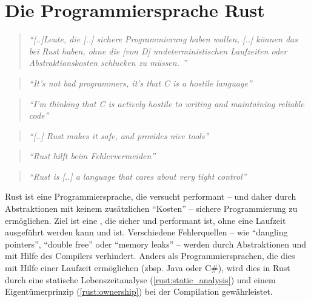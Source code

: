 
\chapter{Die Programmiersprache Rust}

\begin{quotation}
	\textit{\enquote{[..]Leute, die [..] sichere Programmierung haben wollen, [..] können das bei Rust haben, ohne die [von D] undeterministischen Laufzeiten oder Abstraktionskosten schlucken zu müssen. }}
	\cite{rust:fefe}
\end{quotation}

\begin{quotation}
	\textit{\enquote{It’s not bad programmers, it’s that C is a hostile language}} 
	\cite[54]{rust:c_is_hostile_mena}
\end{quotation}

\begin{quotation}
	\textit{\enquote{I’m thinking that C is actively hostile to writing and maintaining reliable code}} 
	\cite[129]{rust:c_is_hostile_mena}
\end{quotation}

\begin{quotation}
	\textit{\enquote{[..] Rust makes it safe, and  provides nice tools}} 
	\cite[130]{rust:c_is_hostile_mena}
\end{quotation}


\begin{quotation}
	\textit{\enquote{Rust hilft beim Fehlervermeiden}} 
	\cite{rust:c_is_hostile_golem}
\end{quotation}

\begin{quotation}
	\textit{\enquote{Rust is [..] a language that cares about very tight control}}
	\cite{rust:tight_control}
\end{quotation}

Rust ist eine Programmiersprache, die versucht performant -- und daher durch Abstraktionen mit keinem zusätzlichen \enquote{Kosten}  -- sichere Programmierung zu ermöglichen.
Ziel ist eine , die sicher  und performant ist, ohne eine Laufzeit ausgeführt werden kann und  ist.
Verschiedene Fehlerquellen -- wie \enquote{dangling pointers}, \enquote{double free} oder \enquote{memory leaks}  --  werden durch Abstraktionen und mit Hilfe des Compilers verhindert.
Anders als Programmiersprachen, die dies mit Hilfe einer Laufzeit ermöglichen (zbsp. Java oder C\#), wird dies in Rust durch eine statische Lebenszeitanalyse (\ref{rust:static_analysis}) und einem Eigentümerprinzip (\ref{rust:ownership}) bei der Compilation gewährleistet.

